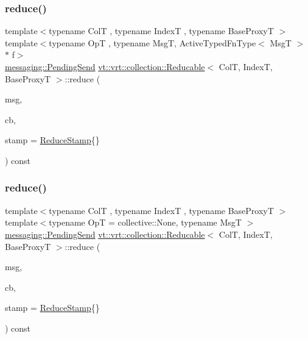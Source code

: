 \subsubsection{\texorpdfstring{reduce()}{reduce()}\hspace{0.1cm}{\footnotesize\ttfamily [3/8]}}
{\footnotesize\ttfamily template$<$typename ColT , typename IndexT , typename Base\+ProxyT $>$ \\
template$<$typename OpT , typename MsgT, Active\+Typed\+Fn\+Type$<$ Msg\+T $>$ $\ast$ f$>$ \\
\hyperlink{structvt_1_1messaging_1_1_pending_send}{messaging\+::\+Pending\+Send} \hyperlink{structvt_1_1vrt_1_1collection_1_1_reducable}{vt\+::vrt\+::collection\+::\+Reducable}$<$ ColT, IndexT, Base\+ProxyT $>$\+::reduce (\begin{DoxyParamCaption}\item[{MsgT $\ast$const}]{msg,  }\item[{\hyperlink{namespacevt_a57b238783d05de96bc2c4027f7073b7f}{Callback}$<$ MsgT $>$}]{cb,  }\item[{\hyperlink{structvt_1_1vrt_1_1collection_1_1_reducable_a19f80baf23f36dad4948ef07322fd0cb}{Reduce\+Stamp}}]{stamp = {\ttfamily \hyperlink{structvt_1_1vrt_1_1collection_1_1_reducable_a19f80baf23f36dad4948ef07322fd0cb}{Reduce\+Stamp}\{\}} }\end{DoxyParamCaption}) const}

\mbox{\label{structvt_1_1vrt_1_1collection_1_1_reducable_a07fa6b35352b3c6ae05a210248601020}} 
\subsubsection{\texorpdfstring{reduce()}{reduce()}\hspace{0.1cm}{\footnotesize\ttfamily [4/8]}}
{\footnotesize\ttfamily template$<$typename ColT , typename IndexT , typename Base\+ProxyT $>$ \\
template$<$typename OpT  = collective\+::\+None, typename MsgT $>$ \\
\hyperlink{structvt_1_1messaging_1_1_pending_send}{messaging\+::\+Pending\+Send} \hyperlink{structvt_1_1vrt_1_1collection_1_1_reducable}{vt\+::vrt\+::collection\+::\+Reducable}$<$ ColT, IndexT, Base\+ProxyT $>$\+::reduce (\begin{DoxyParamCaption}\item[{MsgT $\ast$const}]{msg,  }\item[{\hyperlink{namespacevt_a57b238783d05de96bc2c4027f7073b7f}{Callback}$<$ MsgT $>$}]{cb,  }\item[{\hyperlink{structvt_1_1vrt_1_1collection_1_1_reducable_a19f80baf23f36dad4948ef07322fd0cb}{Reduce\+Stamp}}]{stamp = {\ttfamily \hyperlink{structvt_1_1vrt_1_1collection_1_1_reducable_a19f80baf23f36dad4948ef07322fd0cb}{Reduce\+Stamp}\{\}} }\end{DoxyParamCaption}) const\hspace{0.3cm}{\ttfamily [inline]}}

